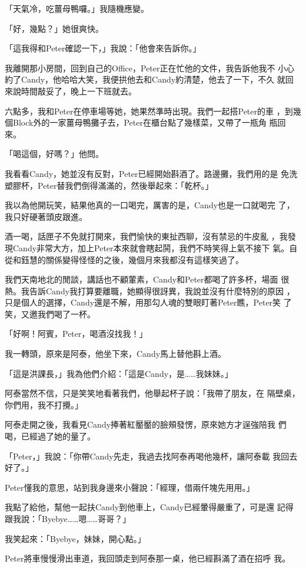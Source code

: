 「天氣冷，吃薑母鴨囉。」我隨機應變。

「好，幾點？」她很爽快。

「這我得和Peter確認一下，」我說：「他會來告訴你。」

我離開那小房間，回到自己的Office，Peter正在忙他的文件，我告訴他我不
小心約了Candy，他哈哈大笑，我便拱他去和Candy約清楚，他去了一下，不久
就回來說時間敲妥了，晚上一下班就去。

六點多，我和Peter在停車場等她，她果然準時出現。我們一起搭Peter的車
，到幾個Block外的一家薑母鴨攤子去，Peter在櫃台點了幾樣菜，又帶了一瓶角
瓶回來。

「喝這個，好嗎？」他問。

我看看Candy，她並沒有反對，Peter已經開始斟酒了。路邊攤，我們用的是
免洗塑膠杯，Peter替我們倒得滿滿的，然後舉起來：「乾杯。」

我以為他開玩笑，結果他真的一口喝完，厲害的是，Candy也是一口就喝完
了，我只好硬著頭皮跟進。

酒一喝，話匣子不免就打開來，我們愉快的東扯西聊，沒有禁忌的牛皮亂
，我發現Candy非常大方，加上Peter本來就會瞎起鬨，我們不時笑得上氣不接下
氣。自從和鈺慧的關係變得怪怪的之後，幾個月來我都沒有這樣笑過了。

我們天南地北的閒談，講話也不顧葷素，Candy和Peter都喝了許多杯，場面
很熱。我告訴Candy我打算要離職，她顯得很訝異，我說並沒有什麼特別的原因
，只是個人的選擇，Candy還是不解，用那勾人魂的雙眼盯著Peter瞧，Peter笑
了笑，又邀我們喝了一杯。

「好啊！阿賓，Peter，喝酒沒找我！」

我一轉頭，原來是阿泰，他坐下來，Candy馬上替他斟上酒。

「這是洪課長，」我為他們介紹：「這是Candy，是……我妹妹。」

阿泰當然不信，只是笑笑地看著我們，他舉起杯子說：「我帶了朋友，在
隔壁桌，你們用，我不打攪。」

阿泰走開之後，我看見Candy捧著紅靨靨的臉頰發愣，原來她方才逞強陪我
們喝，已經過了她的量了。

「Peter，」我說：「你帶Candy先走，我過去找阿泰再喝他幾杯，讓阿泰載
我回去好了。」

Peter懂我的意思，站到我身邊來小聲說：「經理，借兩仟塊先用用。」

我點了給他，幫他一起扶Candy到他車上，Candy已經暈得嚴重了，可是還
記得跟我說：「Byebye……嗯……哥哥？」

我笑起來：「Byebye，妹妹，開心點。」

Peter將車慢慢滑出車道，我回頭走到阿泰那一桌，他已經斟滿了酒在招呼
我。

